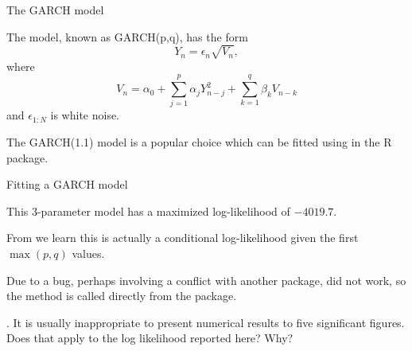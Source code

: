 \begin{frame}[fragile]{The GARCH model}

\bi

\item The  model, known as GARCH(p,q), has the form
$$ Y_n = \epsilon_n \sqrt{V_n},$$
where
$$ V_n = \alpha_0 + \sum_{j=1}^p \alpha_j Y_{n-j}^2 + \sum_{k=1}^q \beta_k V_{n-k}$$
and $\epsilon_{1:N}$ is white noise.


\item The GARCH(1.1) model is a popular choice \citep{cowpertwait09} which can be fitted using  in the  R package.

\ei

\end{frame}


\begin{frame}[fragile]{Fitting a GARCH model}

\vspace{-2mm}

\begin{knitrout}\small
{}\color{fgcolor}\begin{kframe}
\begin{alltt}
 \hlkwb{<-} \hlopt{::}
   \hldef{=} \hldef{,}  \hldef{=} \hldef{)}
 \hlkwb{<-} \hlopt{:::}
\end{alltt}
\end{kframe}
\end{knitrout}

\bi

\item This 3-parameter model has a maximized log-likelihood of $-4019.7$.

\item From  we learn this is actually a conditional log-likelihood given the first $\max(p,q)$ values.

\item Due to a bug, perhaps involving a conflict with another package,  did not work, so the  method is called directly from the  package.

\ei

\vspace{1mm}

\myquestion. It is usually inappropriate to present numerical results to five significant figures. Does that apply to the log likelihood reported here? Why?


\end{frame}

